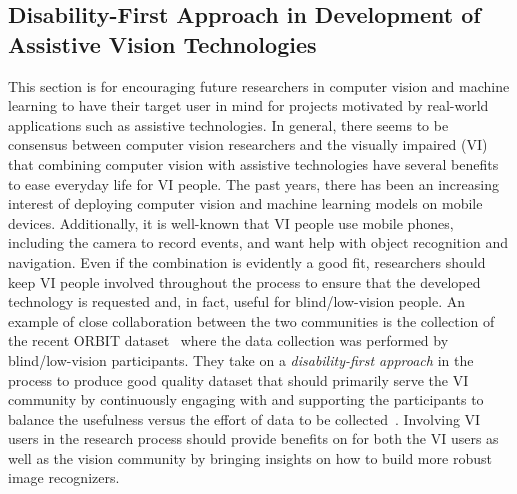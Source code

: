 \subsection{Disability-First Approach in Development of Assistive Vision Technologies}

This section is for encouraging future researchers in computer vision and machine learning to have their target user in mind for projects motivated by real-world applications such as assistive technologies. In general, there seems to be consensus between computer vision researchers and the visually impaired (VI) that combining computer vision with assistive technologies have several benefits to ease everyday life for VI people. The past years, there has been an increasing interest of deploying computer vision and machine learning models on mobile devices. Additionally, it is well-known that VI people use mobile phones, including the camera to record events, and want help with object recognition and navigation. Even if the combination is evidently a good fit, researchers should keep VI people involved throughout the process to ensure that the developed technology is requested and, in fact, useful for blind/low-vision people. An example of close collaboration between the two communities is the collection of the recent ORBIT dataset~\cite{massiceti2021orbit, theodorou2021disability} where the data collection was performed by blind/low-vision participants. They take on a \textit{disability-first approach} in the process to produce good quality dataset that should primarily serve the VI community by continuously engaging with and supporting the participants to balance the usefulness versus the effort of data to be collected~\cite{theodorou2021disability}. Involving VI users in the research process should provide benefits on for both the VI users as well as the vision community by bringing insights on how to build more robust image recognizers. 

